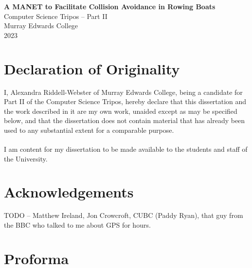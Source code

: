 \documentclass[12pt,a4paper]{report}
\begin{document}


\thispagestyle{empty}


\vspace*{60mm}
\begin{center}
\Huge
\textbf{A MANET to Facilitate Collision Avoidance in Rowing Boats} \\[5mm]
Computer Science Tripos -- Part II \\[5mm]
Murray Edwards College \\[5mm]
2023
\end{center}

\pagestyle{plain}
\chapter*{Declaration of Originality}

I, Alexandra Riddell-Webster of Murray Edwards College, being a candidate for Part II of the Computer Science Tripos, hereby declare that this dissertation and the work described in it are my own work, unaided except as may be specified below, and that the dissertation does not contain material that has already been used to any substantial extent for a comparable purpose. \\ \\
I am content for my dissertation to be made available to the students and staff of the
University. \\

\bigskip
{}

\chapter*{Acknowledgements}
TODO -- Matthew Ireland, Jon Crowcroft, CUBC (Paddy Ryan), that guy from the BBC who talked to me about GPS for hours.



\chapter*{Proforma}
\end{document}
